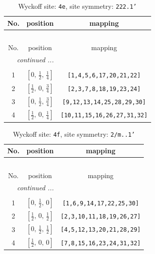 \documentclass[fleqn,8pt]{jsarticle}
\begin{document}
\begin{longtable}{ccc}
\caption{Wyckoff site: {\tt 4e}, site symmetry: {\tt 222.1'}}
 \\
 \hline \hline
No. & position & mapping \\ \hline \endfirsthead

\multicolumn{2}{l}{\tablename\ \thetable{}} \\
 \hline \hline
No. & position & mapping \\ \hline \endhead

 \hline \hline
\multicolumn{2}{r}{\footnotesize\it continued ...} \\ \endfoot

 \hline \hline
\multicolumn{2}{r}{} \\ \endlastfoot

1 & $\left[ 0,\, \frac{1}{2},\, \frac{1}{4} \right]$ & {\tt [1,4,5,6,17,20,21,22]} \\ \hline
2 & $\left[ \frac{1}{2},\, 0,\, \frac{3}{4} \right]$ & {\tt [2,3,7,8,18,19,23,24]} \\ \hline
3 & $\left[ 0,\, \frac{1}{2},\, \frac{3}{4} \right]$ & {\tt [9,12,13,14,25,28,29,30]} \\ \hline
4 & $\left[ \frac{1}{2},\, 0,\, \frac{1}{4} \right]$ & {\tt [10,11,15,16,26,27,31,32]} \\
\end{longtable}
\renewcommand{\arraystretch}{1.2}
\begin{longtable}{ccc}
\caption{Wyckoff site: {\tt 4f}, site symmetry: {\tt 2/m..1'}}
 \\
 \hline \hline
No. & position & mapping \\ \hline \endfirsthead

\multicolumn{2}{l}{\tablename\ \thetable{}} \\
 \hline \hline
No. & position & mapping \\ \hline \endhead

 \hline \hline
\multicolumn{2}{r}{\footnotesize\it continued ...} \\ \endfoot

 \hline \hline
\multicolumn{2}{r}{} \\ \endlastfoot

1 & $\left[ 0,\, \frac{1}{2},\, 0 \right]$ & {\tt [1,6,9,14,17,22,25,30]} \\ \hline
2 & $\left[ \frac{1}{2},\, 0,\, \frac{1}{2} \right]$ & {\tt [2,3,10,11,18,19,26,27]} \\ \hline
3 & $\left[ 0,\, \frac{1}{2},\, \frac{1}{2} \right]$ & {\tt [4,5,12,13,20,21,28,29]} \\ \hline
4 & $\left[ \frac{1}{2},\, 0,\, 0 \right]$ & {\tt [7,8,15,16,23,24,31,32]} \\
\end{longtable}
\end{document}
